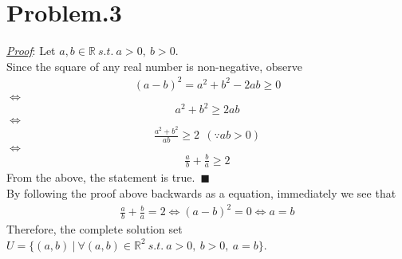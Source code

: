 \documentclass[12pt]{article}
\begin{document}
\section*{Problem.3}
\underline{\textit{Proof}}: Let $a, b \in \mathbb{R} ~s.t.~ a > 0,~b > 0$.\\[1em]
Since the square of any real number is non-negative, observe
\begin{gather*}
(a-b)^2 = a^2 + b^2 - 2ab \geq 0
\end{gather*}
$\Leftrightarrow$
\begin{gather*}
a^2 + b^2 \geq 2ab
\end{gather*}
$\Leftrightarrow$
\begin{gather*}
\frac{a^2 + b^2}{ab} \geq 2 ~~(\because ab > 0)
\end{gather*}
$\Leftrightarrow$
\begin{gather*}
\frac{a}{b} + \frac{b}{a} \geq 2
\end{gather*}
From the above, the statement is true.~$\blacksquare$\\[1em]
By following the proof above backwards as a equation, immediately we see that
\begin{gather*}
\frac{a}{b} + \frac{b}{a} = 2 \Leftrightarrow (a-b)^2 = 0 \Leftrightarrow a = b
\end{gather*}
Therefore, the complete solution set $U = \{(a,b)~|~ \forall (a, b) \in \mathbb{R}^2 ~s.t.~ a>0,~b>0,~a=b\}$.
\end{document}
